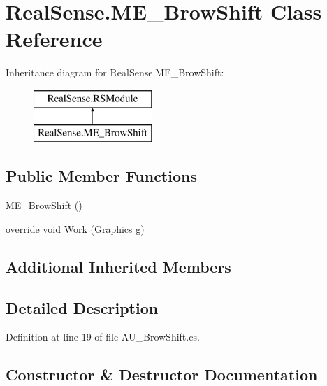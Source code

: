 \hypertarget{class_real_sense_1_1_m_e___brow_shift}{}\section{Real\+Sense.\+M\+E\+\_\+\+Brow\+Shift Class Reference}
\label{class_real_sense_1_1_m_e___brow_shift}
Inheritance diagram for Real\+Sense.\+M\+E\+\_\+\+Brow\+Shift\+:\begin{figure}[H]
\begin{center}
\leavevmode
\includegraphics[height=2.000000cm]{class_real_sense_1_1_m_e___brow_shift}
\end{center}
\end{figure}
\subsection*{Public Member Functions}
\begin{DoxyCompactItemize}
\item 
\hyperlink{class_real_sense_1_1_m_e___brow_shift_a05f9b49a7fca992b931aa57930f1d5ee}{M\+E\+\_\+\+Brow\+Shift} ()
\item 
override void \hyperlink{class_real_sense_1_1_m_e___brow_shift_af80f8b9c8d33de95a782a33b15d80e52}{Work} (Graphics g)
\end{DoxyCompactItemize}
\subsection*{Additional Inherited Members}


\subsection{Detailed Description}


Definition at line 19 of file A\+U\+\_\+\+Brow\+Shift.\+cs.



\subsection{Constructor \& Destructor Documentation}
\mbox{\label{class_real_sense_1_1_m_e___brow_shift_a05f9b49a7fca992b931aa57930f1d5ee}} 
